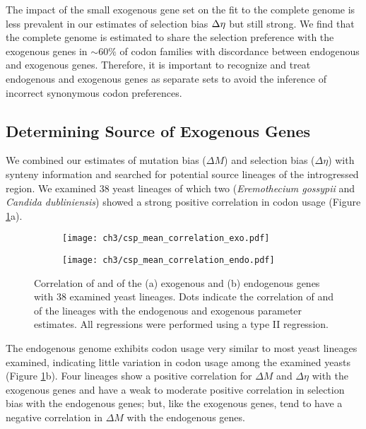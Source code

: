 The impact of the small exogenous gene set on the fit to the complete \kluyveri genome is less prevalent in our estimates of selection bias ${\Delta \eta}$ but still strong.
We find that the complete \kluyveri genome is estimated to share the selection preference with the exogenous genes in $\sim60\%$ of codon families with discordance between endogenous and exogenous genes.
Therefore, it is important to recognize and treat endogenous and exogenous genes as separate sets to avoid the inference of incorrect synonymous codon preferences.

\subsection{Determining Source of Exogenous Genes}

We combined our estimates of mutation bias ($\Delta M$) and selection bias ($\Delta \eta$) with synteny information and searched for potential source lineages of the introgressed region.
We examined 38 yeast lineages of which two (\textit{Eremothecium gossypii} and \textit{Candida dubliniensis}) showed a strong positive correlation in codon usage (Figure \ref{fig:csp_endo_exo_comp}a).
\begin{figure}[h]
    \centering
    \begin{subfigure}
        \centering
        \texttt{[image: ch3/csp\_mean\_correlation\_exo.pdf]}
    \end{subfigure}
    \begin{subfigure}
        \centering
        \texttt{[image: ch3/csp\_mean\_correlation\_endo.pdf]}
    \end{subfigure}
    \caption{Correlation of \DM and \DE of the (a) exogenous and (b) endogenous genes with 38 examined yeast lineages. Dots indicate the correlation of \DM and \DE of the lineages with the endogenous and exogenous parameter estimates. All regressions were performed using a type II regression.}
    \label{fig:csp_endo_exo_comp}
\end{figure}
The endogenous \kluyveri genome exhibits codon usage very similar to most yeast lineages examined, indicating little variation in codon usage among the examined yeasts (Figure \ref{fig:csp_endo_exo_comp}b).
Four lineages show a positive correlation for $\Delta M$ and $\Delta \eta$ with the exogenous genes and have a weak to moderate positive correlation in selection bias with the endogenous genes; but, like the exogenous genes, tend to have a negative correlation in $\Delta M$ with the endogenous genes.

